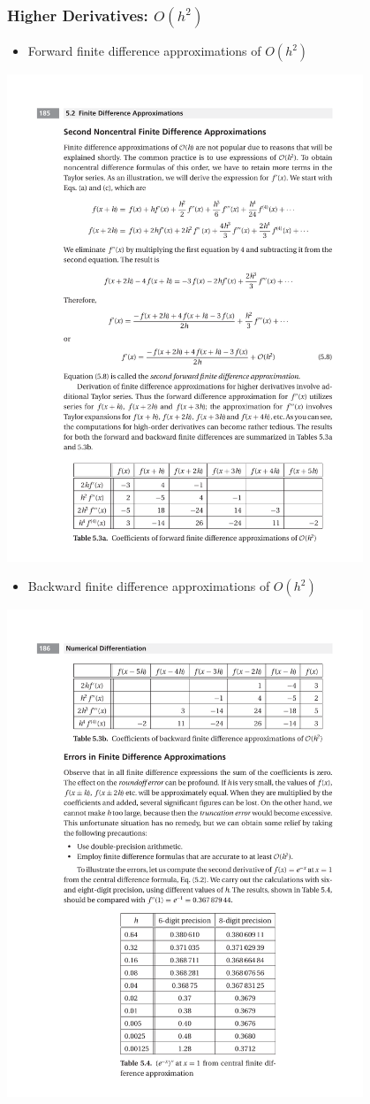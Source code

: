 \documentclass{beamer}
\begin{document}
\begin{frame}[fragile]
\frametitle{Higher Derivatives: $O(h^2)$}

\begin{itemize}
\item Forward finite difference approximations of $O(h^2)$
\end{itemize}
\centerline{\includegraphics[width=0.8\textwidth]{Lec9_Tab4}}
\begin{itemize}
\item Backward finite difference approximations of $O(h^2)$
\end{itemize}
\centerline{\includegraphics[width=0.8\textwidth]{Lec9_Tab5}}
\end{frame}
\end{document}
